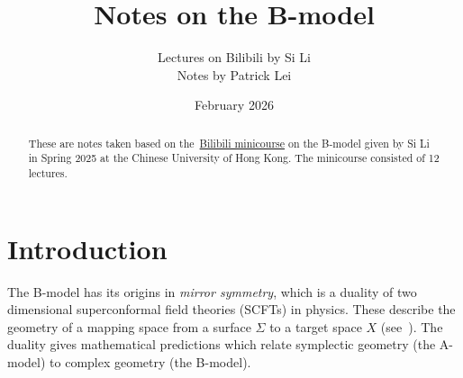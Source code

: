 \documentclass{amsart}
\title{Notes on the B-model}
\author{Lectures on Bilibili by Si Li \\ Notes by Patrick Lei}
\date{February 2026}
\theoremstyle{definition}
\theoremstyle{remark}
\theoremstyle{plain}
\theoremstyle{definition}
\theoremstyle{remark}
\newcommand{\1}{\mathbf{1}}
\newcommand{\2}{\mathbf{2}}
\newcommand{\3}{\mathbf{3}}
\begin{document}
    
\begin{abstract}
    These are notes taken based on the~\href{https://space.bilibili.com/510673295/lists/5119099?type=season}{Bilibili minicourse} on the B-model given by Si Li in Spring 2025 at the Chinese University of Hong Kong. The minicourse consisted of 12 lectures.
\end{abstract}

\maketitle

\tableofcontents

\section{Introduction}%
\label{sec:introduction}

The B-model has its origins in \textit{mirror symmetry}, which is a duality of two dimensional superconformal field theories (SCFTs) in physics. These describe the geometry of a mapping space from a surface \(\Sigma\) to a target space \(X\) (see~). The duality gives mathematical predictions which relate symplectic geometry (the A-model) to complex geometry (the B-model).
\end{document}
